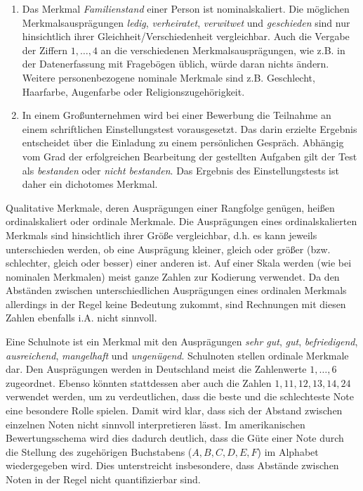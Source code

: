 \documentclass{lecture}
\begin{document}
    \begin{example}
        \begin{enumerate}
            \item Das Merkmal \emph{Familienstand} einer Person ist nominalskaliert.
            Die möglichen Merkmalsausprägungen \emph{ledig}, \emph{verheiratet}, \emph{verwitwet} und \emph{geschieden} sind nur hinsichtlich ihrer Gleichheit/Verschiedenheit vergleichbar.
            Auch die Vergabe der Ziffern \(1, \ldots, 4\) an die verschiedenen Merkmalsausprägungen, wie z.B. in der Datenerfassung mit Fragebögen üblich, würde daran nichts ändern.
            Weitere personenbezogene nominale Merkmale sind z.B. Geschlecht, Haarfarbe, Augenfarbe oder Religionszugehörigkeit.
            \item In einem Großunternehmen wird bei einer Bewerbung die Teilnahme an einem schriftlichen Einstellungstest vorausgesetzt.
            Das darin erzielte Ergebnis entscheidet über die Einladung zu einem persönlichen Gespräch.
            Abhängig vom Grad der erfolgreichen Bearbeitung der gestellten Aufgaben gilt der Test als \emph{bestanden} oder \emph{nicht bestanden}.
            Das Ergebnis des Einstellungstests ist daher ein dichotomes Merkmal.
        \end{enumerate}
    \end{example}

    Qualitative Merkmale, deren Ausprägungen einer Rangfolge genügen, heißen ordinalskaliert oder ordinale Merkmale.
    Die Ausprägungen eines ordinalskalierten Merkmals sind hinsichtlich ihrer Größe vergleichbar, d.h. es kann jeweils unterschieden werden, ob eine Ausprägung kleiner, gleich oder größer (bzw. schlechter, gleich oder besser) einer anderen ist.
    Auf einer Skala werden (wie bei nominalen Merkmalen) meist ganze Zahlen zur Kodierung verwendet.
    Da den Abständen zwischen unterschiedlichen Ausprägungen eines ordinalen Merkmals allerdings in der Regel keine Bedeutung zukommt, sind Rechnungen mit diesen Zahlen ebenfalls i.A. nicht sinnvoll.

    \begin{example}
        Eine Schulnote ist ein Merkmal mit den Ausprägungen \emph{sehr gut}, \emph{gut}, \emph{befriedigend}, \emph{ausreichend}, \emph{mangelhaft} und \emph{ungenügend}.
        Schulnoten stellen ordinale Merkmale dar.
        Den Ausprägungen werden in Deutschland meist die Zahlenwerte \(1, \ldots, 6\) zugeordnet.
        Ebenso könnten stattdessen aber auch die Zahlen \(1, 11, 12, 13, 14, 24\) verwendet werden, um zu verdeutlichen, dass die beste und die schlechteste Note eine besondere Rolle spielen.
        Damit wird klar, dass sich der Abstand zwischen einzelnen Noten nicht sinnvoll interpretieren lässt.
        Im amerikanischen Bewertungsschema wird dies dadurch deutlich, dass die Güte einer Note durch die Stellung des zugehörigen Buchstabens (\(A, B, C, D, E, F\)) im Alphabet wiedergegeben wird.
        Dies unterstreicht insbesondere, dass Abstände zwischen Noten in der Regel nicht quantifizierbar sind.
    \end{example}
\end{document}
